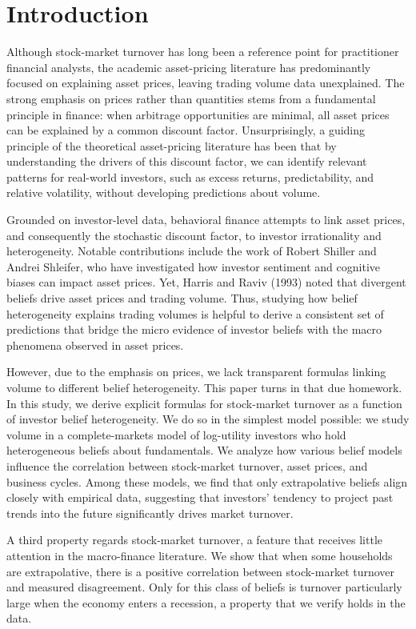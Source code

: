 \section{Introduction}

Although stock-market turnover has long been a reference point for practitioner financial analysts, the academic asset-pricing literature has predominantly focused on explaining asset prices, leaving trading volume data unexplained. The strong emphasis on prices rather than quantities stems from a fundamental principle in finance: when arbitrage opportunities are minimal, all asset prices can be explained by a common discount factor. Unsurprisingly, a guiding principle of the theoretical asset-pricing literature has been that by understanding the drivers of this discount factor, we can identify relevant patterns for real-world investors, such as excess returns, predictability, and relative volatility, without developing predictions about volume.

Grounded on investor-level data, behavioral finance attempts to link asset prices, and consequently the stochastic discount factor, to investor irrationality and heterogeneity. Notable contributions include the work of Robert Shiller and Andrei Shleifer, who have investigated how investor sentiment and cognitive biases can impact asset prices. Yet, Harris and Raviv (1993) noted that divergent beliefs drive asset prices and trading volume. Thus, studying how belief heterogeneity explains trading volumes is helpful to derive a consistent set of predictions that bridge the micro evidence of investor beliefs with the macro phenomena observed in asset prices.

However, due to the emphasis on prices, we lack transparent formulas linking volume to different belief heterogeneity. This paper turns in that due homework. In this study, we derive explicit formulas for stock-market turnover as a function of investor belief heterogeneity. We do so in the simplest model possible: we study volume in a complete-markets model of log-utility investors who hold heterogeneous beliefs about fundamentals. We analyze how various belief models influence the correlation between stock-market turnover, asset prices, and business cycles. Among these models, we find that only extrapolative beliefs align closely with empirical data, suggesting that investors' tendency to project past trends into the future significantly drives market turnover.

A third property regards stock-market turnover, a feature that receives little attention in the macro-finance literature. We show that when some households are extrapolative, there is a positive correlation between stock-market turnover and measured disagreement. Only for this class of beliefs is turnover particularly large when the economy enters a recession, a property that we verify holds in the data. 




